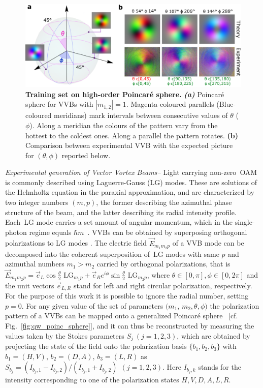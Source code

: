 \begin{figure}
	\centering
	\includegraphics[width=\textwidth]{Figures/quantum-walks/VVBs-results_th_ph_old.pdf}
	\caption{
		\textbf{Training set on high-order Poincar\'e sphere.}
		\textbf{\emph{(a)}} Poincar\'e sphere for \acp{VVB} with $|m_{1,2}|=1$.
		Magenta-coloured parallels (Blue-coloured meridians) mark intervals between consecutive values of $\theta$ ($\phi$). 
	    Along a meridian the colours of the pattern vary from the hottest to the coldest ones. Along a parallel the pattern rotates. 
	    \textbf{(b)} Comparison between experimental \ac{VVB} with the expected picture for $(\theta, \phi)$ reported below.
	}
\end{figure}


\textit{Experimental generation of Vector Vortex Beams--} 
Light carrying non-zero~\ac{OAM} is commonly described using Laguerre-Gauss (\ac{LG}) modes.
These are solutions of the Helmholtz equation in the paraxial approximation, and are characterized by two integer numbers $(m, p)$, the former describing the azimuthal phase structure of the beam, and the latter describing its radial intensity profile.
Each~\ac{LG} mode carries a set amount of angular momentum, which in the single-photon regime equals $\hbar m$~\cite{allen_0AM_1992}.
\acp{VVB} can be obtained by superposing orthogonal polarizations to \ac{LG} modes \cite{padgett2004light}. 
The electric field $\Vec{E}_{m_1m_2p}$ of a \ac{VVB} mode can be decomposed into the coherent superposition of~\ac{LG} modes with same $p$ and azimuthal numbers $m_1>m_2$ carried by orthogonal polarizations, that is
$    \Vec{E}_{m_1m_2p}=\Vec{e}_L \cos{ \frac{\theta}{2}}\text{ LG$_{m_1p}$} +\Vec{e}_R e^{i \phi} \sin{ \frac{\theta}{2}}\text{ LG$_{m_2p}$}$,
where $\theta\in[0,\pi], \phi\in[0,2\pi]$ and the unit vectors $\Vec{e}_{L,R}$ stand for left and right circular polarization, respectively.
For the purpose of this work it is possible to ignore the radial number, setting $p=0$. For any given value of the set of parameters $(m_1$, $m_2, \theta, \phi)$  the polarization pattern of a \acp{VVB} can be mapped onto a generalized Poincar\'e sphere~\cite{milione_poinc_sphere_2011} [cf. Fig.~\ref{fig:qw_poinc_sphere}], and 
it can thus be reconstructed by measuring the values taken by the Stokes parameters $S_{j}~(j=1,2,3)$, which are obtained by projecting the state of the field onto the polarization basis $\{b_1,b_2,b_3\}$ with $b_1=( H,V )$, $b_2=( D,A )$, $b_3=( L,R )$ as 
    $    S_{b_j}=(I_{b_j,1}-I_{b_j,2})/(I_{b_j,1}+I_{b_j,2})~~(j=1,2,3)$.
Here $I_{b_j,k}$ stands for the intensity corresponding to one of the polarization states $H,V,D,A,L,R$.

